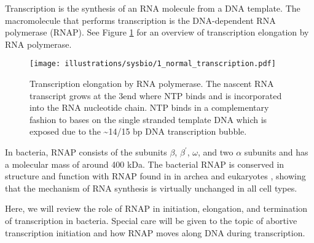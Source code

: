 %
Transcription is the synthesis of an RNA molecule from a DNA template. The
macromolecule that performs transcription is the DNA-dependent RNA polymerase
(RNAP). See Figure \ref{fig:transcription_elongation} for an overview of
transcription elongation by RNA polymerase.

\begin{figure}[htb]
	\begin{center}
		\texttt{[image: illustrations/sysbio/1\_normal\_transcription.pdf]}
	\end{center}
	\caption{Transcription elongation by RNA polymerase. The nascent RNA
	transcript grows at the 3\protect\ppp end where NTP binds and is
	incorporated into the RNA nucleotide chain. NTP binds in a complementary
	fashion to bases on the single stranded template DNA which is exposed due
	to the \sim 14/15 bp DNA transcription bubble.}
	\label{fig:transcription_elongation}
\end{figure}

In bacteria, RNAP consists of the subunits $\beta$, $\beta^{\prime}$, $\omega$,
and two $\alpha$ subunits and has a molecular mass of around 400 kDa. The
bacterial RNAP is conserved in structure and function with RNAP found in in
archea and eukaryotes \cite{borukhov_rna_2008}, showing that the mechanism of
RNA synthesis is virtually unchanged in all cell types.

Here, we will review the role of RNAP in initiation, elongation, and
termination of transcription in bacteria. Special care will be given to the
topic of abortive transcription initiation and how RNAP moves along DNA during
transcription.

